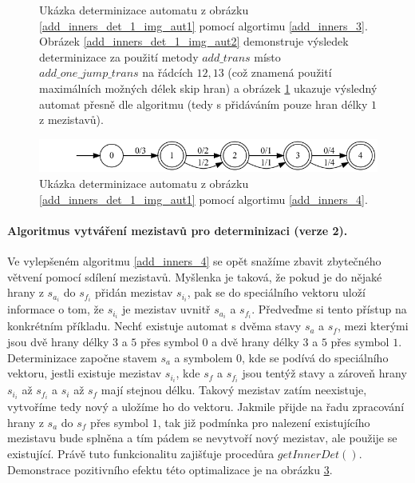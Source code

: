 \begin{figure}
\begin{subfigure}{.25\textwidth}
        \caption{}
        \label{add_inners_det_1_img_aut3}
    \end{subfigure}
    \caption{Ukázka determinizace automatu z obrázku \ref{add_inners_det_1_img_aut1} pomocí algortimu \ref{add_inners_3}. Obrázek \ref{add_inners_det_1_img_aut2} demonstruje výsledek determinizace za použití metody $add\_trans$ místo $add\_one\_jump\_trans$ na řádcích $12,13$ (což znamená použití maximálních možných délek skip hran) a obrázek \ref{add_inners_det_1_img_aut3} ukazuje výsledný automat přesně dle algoritmu (tedy s přidáváním pouze hran délky $1$ z mezistavů).}
    \label{add_inners_det_1_img}
\end{figure}

\begin{figure}
    \centering
    \includegraphics[scale=0.37]{obrazky-figures/add_inners_det_2_img_aut1.png}
    \caption{Ukázka determinizace automatu z obrázku \ref{add_inners_det_1_img_aut1} pomocí algortimu \ref{add_inners_4}.}
    \label{add_inners_det_2_img}
\end{figure}

\paragraph{Algoritmus vytváření mezistavů pro determinizaci (verze 2).} Ve vylepšeném algoritmu \ref{add_inners_4} se opět snažíme zbavit zbytečného větvení pomocí sdílení mezistavů. Myšlenka je taková, že pokud je do nějaké hrany z $s_{a_i}$ do $s_{f_i}$ přidán mezistav $s_{i_i}$, pak se do speciálního vektoru uloží informace o tom, že $s_{i_i}$ je mezistav uvnitř $s_{a_i}$ a $s_{f_i}$. Předveďme si tento přístup na konkrétním příkladu. Nechť existuje automat s dvěma stavy $s_a$ a $s_f$, mezi kterými jsou dvě hrany délky $3$ a $5$ přes symbol $0$ a dvě hrany délky $3$ a $5$ přes symbol $1$. Determinizace započne stavem $s_a$ a symbolem $0$, kde se podívá do speciálního vektoru, jestli existuje mezistav $s_{i_i}$, kde $s_f$ a $s_{f_i}$ jsou tentýž stavy a zároveň hrany $s_{i_i}$ až $s_{f_i}$ a $s_i$ až $s_f$ mají stejnou délku. Takový mezistav zatím neexistuje, vytvoříme tedy nový a uložíme ho do vektoru. Jakmile přijde na řadu zpracování hrany z $s_a$ do $s_f$ přes symbol $1$, tak již podmínka pro nalezení existujícího mezistavu bude splněna a tím pádem se nevytvoří nový mezistav, ale použije se existující. Právě tuto funkcionalitu zajišťuje procedůra $getInnerDet()$. Demonstrace pozitivního efektu této optimalizace je na obrázku \ref{add_inners_det_2_img}.

